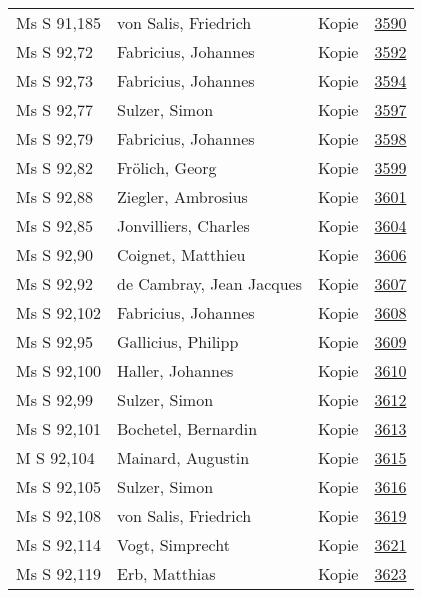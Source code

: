\documentclass[10pt,a4paper,landscape]{report}
\begin{document}
\begin{longtable}{p{16cm}p{4cm}lr}
Ms S 91,185	&	von Salis, Friedrich	&	Kopie	&	\href{http://130.60.24.72/assignment/3590}{3590}\\
Ms S 92,72	&	Fabricius, Johannes	&	Kopie	&	\href{http://130.60.24.72/assignment/3592}{3592}\\
Ms S 92,73	&	Fabricius, Johannes	&	Kopie	&	\href{http://130.60.24.72/assignment/3594}{3594}\\
Ms S 92,77	&	Sulzer, Simon	&	Kopie	&	\href{http://130.60.24.72/assignment/3597}{3597}\\
Ms S 92,79	&	Fabricius, Johannes	&	Kopie	&	\href{http://130.60.24.72/assignment/3598}{3598}\\
Ms S 92,82	&	Frölich, Georg	&	Kopie	&	\href{http://130.60.24.72/assignment/3599}{3599}\\
Ms S 92,88	&	Ziegler, Ambrosius	&	Kopie	&	\href{http://130.60.24.72/assignment/3601}{3601}\\
Ms S 92,85	&	Jonvilliers, Charles	&	Kopie	&	\href{http://130.60.24.72/assignment/3604}{3604}\\
Ms S 92,90	&	Coignet, Matthieu	&	Kopie	&	\href{http://130.60.24.72/assignment/3606}{3606}\\
Ms S 92,92	&	de Cambray, Jean Jacques	&	Kopie	&	\href{http://130.60.24.72/assignment/3607}{3607}\\
Ms S 92,102	&	Fabricius, Johannes	&	Kopie	&	\href{http://130.60.24.72/assignment/3608}{3608}\\
Ms S 92,95	&	Gallicius, Philipp	&	Kopie	&	\href{http://130.60.24.72/assignment/3609}{3609}\\
Ms S 92,100	&	Haller, Johannes	&	Kopie	&	\href{http://130.60.24.72/assignment/3610}{3610}\\
Ms S 92,99	&	Sulzer, Simon	&	Kopie	&	\href{http://130.60.24.72/assignment/3612}{3612}\\
Ms S 92,101	&	Bochetel, Bernardin	&	Kopie	&	\href{http://130.60.24.72/assignment/3613}{3613}\\
M S 92,104	&	Mainard, Augustin	&	Kopie	&	\href{http://130.60.24.72/assignment/3615}{3615}\\
Ms S 92,105	&	Sulzer, Simon	&	Kopie	&	\href{http://130.60.24.72/assignment/3616}{3616}\\
Ms S 92,108	&	von Salis, Friedrich	&	Kopie	&	\href{http://130.60.24.72/assignment/3619}{3619}\\
Ms S 92,114	&	Vogt, Simprecht	&	Kopie	&	\href{http://130.60.24.72/assignment/3621}{3621}\\
Ms S 92,119	&	Erb, Matthias	&	Kopie	&	\href{http://130.60.24.72/assignment/3623}{3623}\\

\end{longtable}
\end{document}
